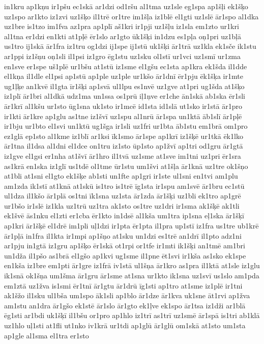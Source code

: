 {in1kru
ap1kņu
ir1pšu
ec1skā
ar1dzi
od1ršu
al1tma
uz1sle
eg1spa
ap1šļi
ek1šķo
uz1spo
ar1kto
iz1zvi
uz1šķo
il1trē
or1tre
im1šļa
iz1blē
el1gti
uz1slē
ār1spo
al1dka
uz1bre
is1tzo
im1fva
az1pra
ap1plī
aš1kri
ir1pji
uz1šļu
iz1sla
em1zto
ur1kri
al1tna
er1dzi
en1kti
at1pļē
ēr1slo
ar1gto
ūk1šķi
in1dzu
es1pļa
oņ1pri
uz1bļā
us1tro
ij1skā
ār1fra
iz1tru
og1dzi
ij1spe
ij1stū
uk1šķi
ār1trā
uz1kla
ek1sče
ik1stu
ar1ppi
iz1šņu
oņ1sli
il1psi
iz1gro
ēg1stu
uz1sku
ol1stī
ur1vci
uz1smī
ur1zma
en1sve
er1spe
uš1plē
ur1bšu
at1stū
iz1sme
el1gšu
ec1sta
ap1kra
ek1šda
il1dde
el1kņa
il1dle
el1psi
ap1stū
ap1ple
uz1ple
ur1kšo
ār1dnī
ēr1pju
ēk1šķa
ir1mte
ug1ļķe
an1kvē
il1gta
īr1šķi
ap1svā
ul1lpu
es1nvē
uz1gve
at1pri
ug1šda
at1šķo
iz1plī
ār1bri
al1dkā
udz1ma
un1ssa
os1prū
iļ1ņve
er1che
ān1skā
ab1ska
ēr1sli
ār1krī
al1kšu
ur1sto
ūg1sna
uk1sto
ir1mcē
id1sta
id1slā
ut1sko
ir1stā
ār1pro
ir1kti
ār1kre
ap1glu
as1tne
iz1švī
uz1spu
al1nrū
ār1spa
un1ktā
āb1slī
ār1pļē
ir1bju
ur1bto
el1svi
un1ktū
ug1šga
ir1sli
uz1fri
ur1bta
āb1stu
em1brā
om1pro
ez1glā
ep1sto
al1kme
iz1blī
ar1ksi
īk1smo
ār1spe
ap1krī
iz1šķē
ur1tkā
ēk1lko
ār1tna
il1dsa
al1dni
el1dce
on1tru
iz1sto
ūp1sto
ap1žvī
ap1tri
od1gru
ār1gtā
iz1gve
el1gsi
er1nha
at1švī
ār1hro
il1tvā
uz1sme
at1sve
im1tni
uz1pri
ēr1sra
as1krā
en1ska
iz1glī
us1tdē
ol1tme
ūr1stu
um1švi
at1šļa
ār1knā
uz1tre
ok1šņo
at1bli
at1sni
el1gto
ek1šķe
ab1sti
un1fte
ap1gri
ir1ste
ul1sni
en1tvi
am1plu
am1zda
ik1stī
at1knā
at1skū
is1tro
is1trē
īg1sta
ir1spu
am1svē
ār1bru
ec1stū
ul1dza
il1kšo
ār1plā
os1tni
īk1sna
uz1sta
ār1zda
ār1šķi
uz1bli
ek1tro
ap1grē
ur1bšo
ir1slē
iz1kla
uz1trū
uz1tra
ak1sto
os1tre
uz1dri
ir1sma
ak1šķē
ak1tli
ek1švē
ās1nku
el1zti
er1cba
ēr1kto
in1dsē
al1kša
um1tra
ip1sna
eļ1ska
ār1šķī
ap1kri
ār1šķē
el1drē
im1pli
uļ1dzi
ir1pta
ēr1pta
il1pra
up1stī
iz1fra
us1tre
ub1krē
ār1pļā
in1fra
il1kta
ir1mpi
ap1šņo
at1sku
un1dzi
es1trē
an1drī
il1pto
adz1ni
ar1pju
in1gtā
iz1gru
ap1šķo
ēr1skā
ot1rpi
or1tfe
ir1mti
ik1šķi
an1tmē
am1bri
un1dža
il1pšo
as1brā
el1gšo
ap1kvi
ug1sme
il1pne
ēt1svi
ir1kša
as1sko
ek1spe
en1kša
iz1bre
em1pti
ār1gre
iz1frā
iv1stā
ul1šņa
ār1kro
as1pra
il1ktā
at1sle
iz1glu
ik1snā
ok1šņa
um1šma
ār1gru
ār1sme
at1sna
ur1kto
ik1sna
uz1svī
us1slo
am1pda
em1ztā
uz1žva
is1smi
ēr1tnī
ār1gtu
ār1drū
īg1sti
ap1tro
at1sme
iz1plē
ir1tni
ak1šžo
il1sku
ul1bša
um1spo
āk1sli
ap1blo
ār1dze
ār1kva
uk1sne
āt1rvi
ap1žva
am1stu
an1dra
ār1gšo
ek1stē
ār1slo
ār1gto
ek1ļve
ek1spo
ār1tsa
iz1dži
ar1blā
ēg1sti
ar1bdi
uk1šķī
il1bšu
or1pro
ap1hlo
iz1trī
as1trī
uz1smē
ār1spā
is1tri
ab1klā
uz1hlo
uļ1sti
at1fli
ut1nko
iv1krā
ur1tdi
ap1glū
ār1glū
om1skā
at1sto
um1sta
ap1gle
al1sma
el1tra
er1sto
}
